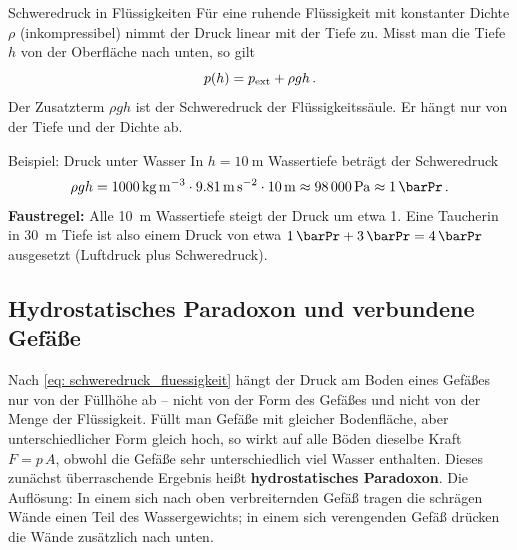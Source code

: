 \begin{rememberbox}{Schweredruck in Flüssigkeiten}
    Für eine ruhende Flüssigkeit mit konstanter Dichte $\rho$ (inkompressibel) nimmt der Druck linear mit der Tiefe zu. Misst man die Tiefe $h$ von der Oberfläche nach unten, so gilt
    \begin{equation}\label{eq: schweredruck_fluessigkeit}
        p(h) = p_{\text{ext}} + \rho g h \,.
    \end{equation}
    Der Zusatzterm $\rho g h$ ist der Schweredruck der Flüssigkeitssäule. Er hängt nur von der Tiefe und der Dichte ab.
\end{rememberbox}

\begin{examplebox}[]{Beispiel: Druck unter Wasser}
    In $h = \SI{10}{\meter}$ Wassertiefe beträgt der Schweredruck
    \begin{equation*}
        \rho g h = \SI{1000}{\kilogram\per\meter\cubed} \cdot \SI{9.81}{\meter\per\second\squared} \cdot \SI{10}{\meter} \approx \SI{98000}{\pascal} \approx \SI{1}{\barPr} \mDot
    \end{equation*}
    \textbf{Faustregel:} Alle \SI{10}{\meter} Wassertiefe steigt der Druck um etwa \SI{1}{\barPr}. Eine Taucherin in \SI{30}{\meter} Tiefe ist also einem Druck von etwa $\SI{1}{\barPr} + \SI{3}{\barPr} = \SI{4}{\barPr}$ ausgesetzt (Luftdruck plus Schweredruck).
\end{examplebox}

\subsection{Hydrostatisches Paradoxon und verbundene Gefäße}\label{subsec: hydrostatisches_paradoxon}
Nach \cref{eq: schweredruck_fluessigkeit} hängt der Druck am Boden eines Gefäßes nur von der Füllhöhe ab -- nicht von der Form des Gefäßes und nicht von der Menge der Flüssigkeit. Füllt man Gefäße mit gleicher Bodenfläche, aber unterschiedlicher Form gleich hoch, so wirkt auf alle Böden dieselbe Kraft $F = p\,A$, obwohl die Gefäße sehr unterschiedlich viel Wasser enthalten. Dieses zunächst überraschende Ergebnis heißt \textbf{hydrostatisches Paradoxon}. Die Auflösung: In einem sich nach oben verbreiternden Gefäß tragen die schrägen Wände einen Teil des Wassergewichts; in einem sich verengenden Gefäß drücken die Wände zusätzlich nach unten.

